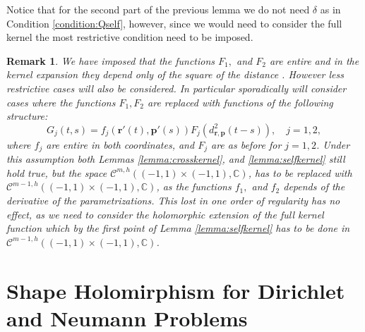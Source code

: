 \documentclass{article}
\newtheorem{remark}[theorem]{Remark}
\newcommand{\IC}{{\mathbb C}}
\newcommand{\bp}{{\bm p}}
\newcommand{\cmspaceh}[4]{\mathcal{C}^{#1,#2} \left( #3, #4 \right)}
\newcommand{\br}{\bm{r}}
\newcommand{\iinterv}{(-1,1)\times(-1,1)}
\begin{document}
Notice that for the second part of the previous lemma we do not need $\delta$ as in Condition \ref{condition:Qself}, however, since we would need to consider the full kernel the most restrictive condition need to be imposed. 
\begin{remark}
\label{remark:lessregularitykernel}
We have imposed that the functions $F_1,$ and $F_2$ are entire and in the kernel expansion they depend only of the square of the distance . However less restrictive cases will also be considered. In particular sporadically will consider cases where the functions $F_1,F_2$ are replaced with functions of the following structure:  
$$
G_j(t,s) = f_j(\br'(t),\bp'(s))F_j(d_{\br,\bp}^2(t-s)), \quad j=1,2,
$$
where $f_j$ are entire in both coordinates, and $F_j$ are as before for $j=1,2$. Under this assumption both Lemmas \ref{lemma:crosskernel}, and \ref{lemma:selfkernel} still hold true, but the space $\cmspaceh{m}{h}{\iinterv}{\IC}$, has to be replaced with $\cmspaceh{m-1}{h}{\iinterv}{\IC}$, as the functions $f_1,$ and $f_2$ depends of the derivative of the parametrizations. This lost in one order of regularity has no effect, as we need to consider the holomorphic extension of the full kernel function which by the first point of Lemma \ref{lemma:selfkernel} has to be done in $\cmspaceh{m-1}{h}{\iinterv}{\IC}$.
\end{remark}


\section{Shape Holomirphism for Dirichlet and Neumann Problems}
\end{document}
